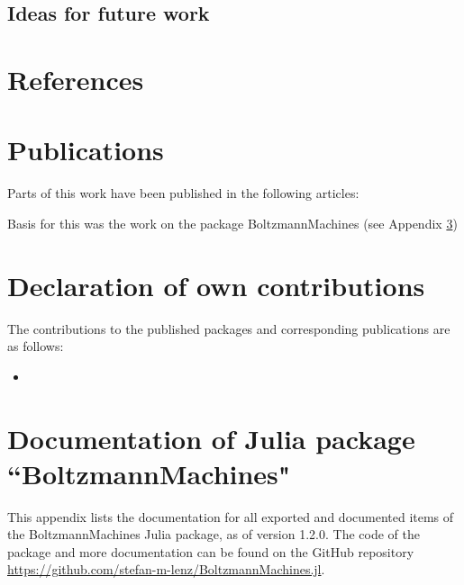 \documentclass[12pt]{article}
\begin{document}

\subsection{Ideas for future work}

\clearpage
\appendix



\begin{appendices}
\section{References}
\renewcommand{\bibsection}{} %



\section{Publications}
Parts of this work have been published in the following articles:


Basis for this was the work on the package BoltzmannMachines (see Appendix \ref{declcontr})

\section{Declaration of own contributions}\label{declcontr}

The contributions to the published packages and corresponding publications are as follows:

\begin{itemize}
\item 
\end{itemize}

\clearpage
\section[Documentation of Julia package ``BoltzmannMachines"]{Documentation of Julia package \\ ``BoltzmannMachines"}

This appendix lists the documentation for all exported and documented items of the BoltzmannMachines Julia package, as of version 1.2.0. The code of the package and more documentation can be found on the GitHub repository \url{https://github.com/stefan-m-lenz/BoltzmannMachines.jl}.


\end{appendices}
\end{document}
